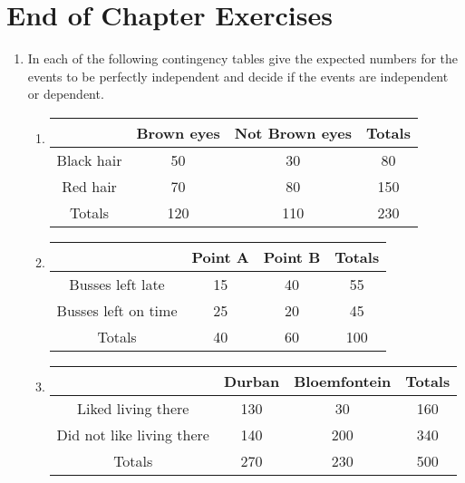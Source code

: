 \section{End of Chapter Exercises}
\begin{enumerate}
\item In each of the following contingency tables give the expected numbers for the events to be perfectly independent and decide if the events are independent or dependent.
	\begin{enumerate}
	\item \begin{center}
\begin{tabular}{|c|c|c|c|}
\hline
           & Brown eyes & Not Brown eyes & Totals \\
\hline
Black hair & 50         & 30             & 80     \\
Red hair   & 70         & 80             & 150    \\
\hline
Totals     & 120        & 110            & 230    \\
\hline
\end{tabular}
\end{center}

	\item \begin{center}
\begin{tabular}{|c|c|c|c|}
\hline
                    & Point A & Point B & Totals \\
\hline
Busses left late    & 15      & 40      & 55     \\
Busses left on time & 25      & 20      & 45     \\
\hline
Totals              & 40      & 60      & 100    \\
\hline
\end{tabular}
\end{center}

	\item \begin{center}
\begin{tabular}{|c|c|c|c|}
\hline
                          & Durban & Bloemfontein & Totals \\
\hline
Liked living there        & 130    & 30           & 160    \\
Did not like living there & 140    & 200          & 340    \\
\hline
Totals                    & 270    & 230          & 500    \\
\hline
\end{tabular}
\end{center}


\end{enumerate}
\end{enumerate}
